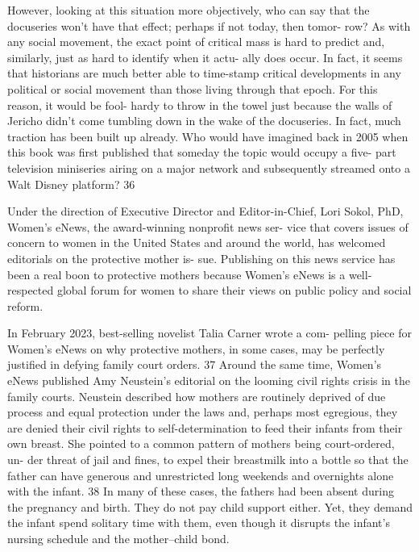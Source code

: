 However, looking at this situation more objectively, who can say that
the docuseries won’t have that effect; perhaps if not today, then tomor-
row? As with any social movement, the exact point of critical mass is
hard to predict and, similarly, just as hard to identify when it actu-
ally does occur. In fact, it seems that historians are much better able to
time-stamp critical developments in any political or social movement
than those living through that epoch. For this reason, it would be fool-
hardy to throw in the towel just because the walls of Jericho didn’t come
tumbling down in the wake of the docuseries. In fact, much traction has
been built up already. Who would have imagined back in 2005 when this
book was first published that someday the topic would occupy a five-
part television miniseries airing on a major network and subsequently
streamed onto a Walt Disney platform? 36 \pfl{}



Under the direction of Executive Director and Editor-in-Chief, Lori
Sokol, PhD, Women’s eNews, the award-winning nonprofit news ser-
vice that covers issues of concern to women in the United States and
around the world, has welcomed editorials on the protective mother is-
sue. Publishing on this news service has been a real boon to protective
mothers because Women’s eNews is a well-respected global forum for
women to share their views on public policy and social reform. \pfl{}


In February 2023, best-selling novelist Talia Carner wrote a com-
pelling piece for Women’s eNews on why protective mothers, in some
cases, may be perfectly justified in defying family court orders. 37 Around
the same time, Women’s eNews published Amy Neustein’s editorial on
the looming civil rights crisis in the family courts. Neustein described
how mothers are routinely deprived of due process and equal protection
under the laws and, perhaps most egregious, they are denied their civil
rights to self-determination to feed their infants from their own breast.
She pointed to a common pattern of mothers being court-ordered, un-
der threat of jail and fines, to expel their breastmilk into a bottle so
that the father can have generous and unrestricted long weekends and
overnights alone with the infant. 38 In many of these cases, the fathers
had been absent during the pregnancy and birth. They do not pay child
support either. Yet, they demand the infant spend solitary time with
them, even though it disrupts the infant’s nursing schedule and the
mother–child bond. \pfl{}


